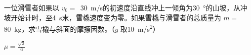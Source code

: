 一位滑雪者如果以 \(v_0 =\) \,\qty{30}{m/s}的初速度沿直线冲上一倾角为\qty{30}{\degree}的山坡，从冲坡开始计时，至\qty{4}{s}末，雪橇速度变为零。如果雪橇与滑雪者的总质量为 \(m =\) \,\qty{80}{kg}，求雪橇与斜面的摩擦因数。（\(g\) 取\qty{10}{m/s^2}）
\begin{answer}
    \(\mu = \frac{\sqrt{3}}{6} \)
\end{answer}